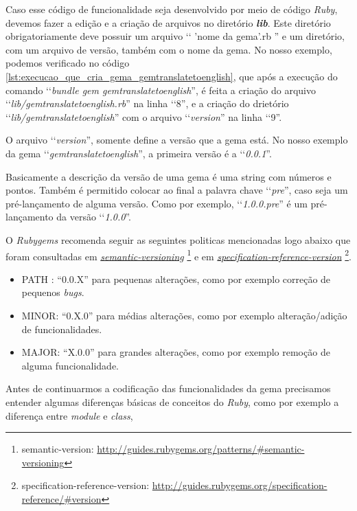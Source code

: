 Caso esse código de funcionalidade seja desenvolvido por meio de código \emph{Ruby}, devemos fazer a
edição e a criação de arquivos no diretório \emph{\textbf{lib}}. Este diretório obrigatoriamente deve
possuir um arquivo ‘‘ 'nome da gema'.rb '' e um diretório, com um arquivo de versão, também com o
nome da gema. No nosso exemplo, podemos verificado no código
\ref{lst:execucao_que_cria_gema_gemtranslatetoenglish}, que após a execução do comando
‘‘\emph{bundle gem gemtranslatetoenglish}'', é feita a criação do arquivo
‘‘\emph{lib/gemtranslatetoenglish.rb}'' na linha ‘‘8'', e a criação do drietório
‘‘\emph{lib/gemtranslatetoenglish}'' com o arquivo ‘‘\emph{version}'' na linha ‘‘9''.

O arquivo ‘‘\emph{version}'', somente define a versão que a gema está. No nosso exemplo da gema 
‘‘\emph{gemtranslatetoenglish}'', a primeira versão é a ‘‘\emph{0.0.1}''. 

Basicamente a descrição da versão de uma gema é uma string com números e pontos. Também é permitido 
colocar ao final a palavra chave ‘‘\emph{pre}'', caso seja um pré-lançamento de alguma versão. Como 
por exemplo, ‘‘\emph{1.0.0.pre}'' é um pré-lançamento da versão ‘‘\emph{1.0.0}''.

O \emph{Rubygems} recomenda seguir as seguintes politicas mencionadas logo abaixo que foram consultadas
em \emph{\href{http://guides.rubygems.org/patterns/\#semantic-versioning}{semantic-versioning}}
\footnote{semantic-version: \url{http://guides.rubygems.org/patterns/\#semantic-versioning}} e em
\emph{\href{http://guides.rubygems.org/specification-reference/\#version}{specification-reference-version}}
\footnote{specification-reference-version: \url{http://guides.rubygems.org/specification-reference/\#version}}.

\begin{itemize}
 \item PATH : “0.0.X” para pequenas alterações, como por exemplo correção de pequenos \emph{bugs}.
 \item MINOR: “0.X.0” para médias alterações, como por exemplo alteração/adição de funcionalidades.
 \item MAJOR: “X.0.0” para grandes alterações, como por exemplo remoção de alguma funcionalidade.
\end{itemize}

Antes de continuarmos a codificação das funcionalidades da gema precisamos entender algumas diferenças
básicas de conceitos do \emph{Ruby}, como por exemplo a diferença entre \emph{module} e \emph{class},

